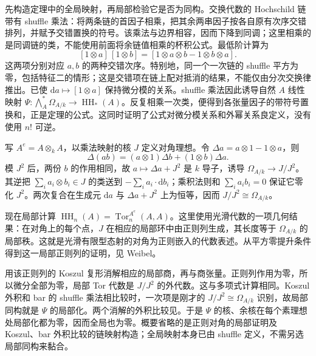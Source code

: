 \begin{proofsketch}
	先构造定理中的全局映射，再局部检验它是否为同构。交换代数的 Hochschild 链带有 shuffle 乘法：将两条链的首因子相乘，把其余两串因子按各自原有次序交错排列，并赋予交错置换的符号。该乘法与边界相容，因而下降到同调；这里相乘的是同调链的类，不能使用前面将余链值相乘的杯积公式。最低阶计算为
	\[
		[1\otimes a]\,[1\otimes b] =[1\otimes a\otimes b-1\otimes b\otimes a].
	\]
	这两项分别对应 \(a,b\) 的两种交错次序。特别地，同一个一次链的 shuffle 平方为零，包括特征二的情形；这是交错项在链上配对抵消的结果，不能仅由分次交换律推出。已使 \(\mathrm{d}a\mapsto[1\otimes a]\) 保持微分模的关系。shuffle 乘法因此诱导自然 \(A\) 线性映射 \(\Psi:\bigwedge_A^*\Omega_{A/k}\to\operatorname{HH}_*(A)\)。反复相乘一次类，便得到各张量因子的带符号置换和，正是定理的公式。这同时证明了公式对微分模关系和外幂关系良定义，没有使用 \(n!\) 可逆。

	写 \(A^e=A\otimes_kA\)，以乘法映射的核 \(J\) 定义对角理想。令 \(\Delta a=a\otimes1-1\otimes a\)，则
	\[
		\Delta(ab)=(a\otimes1)\Delta b+(1\otimes b)\Delta a.
	\]
	模 \(J^2\) 后，两份 \(b\) 的作用相同，故 \(a\mapsto\Delta a+J^2\) 是 \(k\) 导子，诱导 \(\Omega_{A/k}\to J/J^2\)。其逆把 \(\sum_i a_i\otimes b_i\in J\) 的类送到 \(-\sum_i a_i\cdot\mathrm{d}b_i\)；乘积法则和 \(\sum_i a_ib_i=0\) 保证它零化 \(J^2\)。两次复合在生成元 \(\mathrm{d}a\) 与 \(\Delta a+J^2\) 上为恒等，因而 \(J/J^2\cong\Omega_{A/k}\)。

	现在局部计算 \(\operatorname{HH}_n(A)=\operatorname{Tor}^{A^e}_n(A,A)\)。这里使用光滑代数的一项几何结果：在对角上的每个点，\(J\) 在相应的局部环中由正则列生成，其长度等于 \(\Omega_{A/k}\) 的局部秩。这就是光滑有限型态射的对角为正则嵌入的代数表述。从平方零提升条件得到这一局部正则列的证明，见 Weibel\cite[Proposition 9.4.6 and proof of Theorem 9.4.7, pp. 322--323]{Weibel1994HomologicalAlgebra}。

	用该正则列的 Koszul 复形消解相应的局部商，再与商张量。正则列作用为零，所以微分全部为零，局部 Tor 代数是 \(J/J^2\) 的外代数。这与多项式计算相同。Koszul 外积和 bar 的 shuffle 乘法相比较时，一次项是刚才的 \(J/J^2\cong\Omega_{A/k}\) 识别，故局部同构就是 \(\Psi\) 的局部化。两个消解的外积比较见\cite[Application 8.7.12, Example 8.7.13, pp. 291--292; Corollary 9.4.4 and proof of Theorem 9.4.7, pp. 322--323]{Weibel1994HomologicalAlgebra}。于是 \(\Psi\) 的核、余核在每个素理想处局部化都为零，因而全局也为零。概要省略的是正则对角的局部证明及 Koszul、bar 外积比较的链映射构造；全局映射本身已由 shuffle 定义，不需另选局部同构来黏合。
\end{proofsketch}

